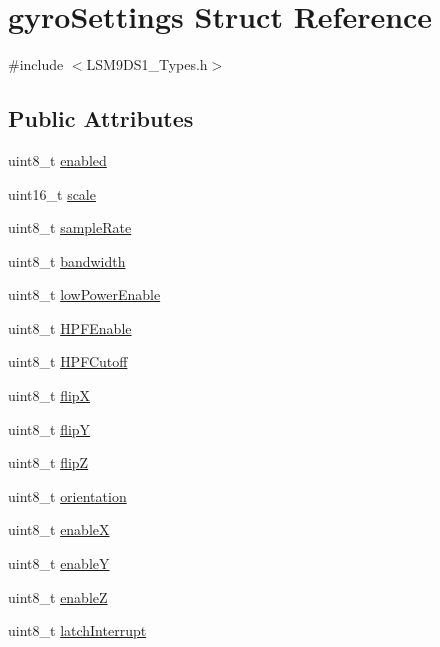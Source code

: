 \hypertarget{structgyro_settings}{}\section{gyro\+Settings Struct Reference}
\label{structgyro_settings}


{\ttfamily \#include $<$L\+S\+M9\+D\+S1\+\_\+\+Types.\+h$>$}

\subsection*{Public Attributes}
\begin{DoxyCompactItemize}
\item 
uint8\+\_\+t \hyperlink{structgyro_settings_ac9c769eeefed971baac74a7b81b25e7b}{enabled}
\item 
uint16\+\_\+t \hyperlink{structgyro_settings_a70ced5c47e97d4dd6770954117ad3a9f}{scale}
\item 
uint8\+\_\+t \hyperlink{structgyro_settings_a58ebac4d1f242d6b129570396a7355b0}{sample\+Rate}
\item 
uint8\+\_\+t \hyperlink{structgyro_settings_ac3f0782333ec55165c1f589d445ba374}{bandwidth}
\item 
uint8\+\_\+t \hyperlink{structgyro_settings_a296a167235d876fa79afc471399e763b}{low\+Power\+Enable}
\item 
uint8\+\_\+t \hyperlink{structgyro_settings_aa7aa5eba55588e4bcfc0be9ea9b6ed8d}{H\+P\+F\+Enable}
\item 
uint8\+\_\+t \hyperlink{structgyro_settings_a7357a9b858fdf515e969ae4e06459f37}{H\+P\+F\+Cutoff}
\item 
uint8\+\_\+t \hyperlink{structgyro_settings_a877b529e39287bed155acbca97a75540}{flipX}
\item 
uint8\+\_\+t \hyperlink{structgyro_settings_a2137659e07899a0efccc941e003c07e0}{flipY}
\item 
uint8\+\_\+t \hyperlink{structgyro_settings_a94c92be9f7c56dd9cd21120307d7373f}{flipZ}
\item 
uint8\+\_\+t \hyperlink{structgyro_settings_a33239fd5c4a0fd74670455008c2701ee}{orientation}
\item 
uint8\+\_\+t \hyperlink{structgyro_settings_a7c1000d1151579743faa376d49751f1d}{enableX}
\item 
uint8\+\_\+t \hyperlink{structgyro_settings_a4d6ea95b7a52daab6d48dc128c83f3d8}{enableY}
\item 
uint8\+\_\+t \hyperlink{structgyro_settings_a86a86182fd841bd651672d43803b5c63}{enableZ}
\item 
uint8\+\_\+t \hyperlink{structgyro_settings_a3eb9f52cae013b107fbc5059220f9333}{latch\+Interrupt}
\end{DoxyCompactItemize}


